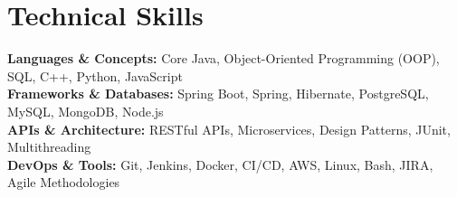 \medskip

\resumeItemListStart
{}
\resumeItemListEnd
\resumeItemListEnd

\resumeSubHeadingListEnd

\section{Technical Skills}
\begin{itemize}[leftmargin=0.15in, label={}]
  \small{\item{
        \textbf{Languages \& Concepts:} {Core Java, Object-Oriented Programming (OOP), SQL, C++, Python, JavaScript} \\
        \textbf{Frameworks \& Databases:} {Spring Boot, Spring, Hibernate, PostgreSQL, MySQL, MongoDB, Node.js} \\
        \textbf{APIs \& Architecture:} {RESTful APIs, Microservices, Design Patterns, JUnit, Multithreading} \\
        \textbf{DevOps \& Tools:} {Git, Jenkins, Docker, CI/CD, AWS, Linux, Bash, JIRA, Agile Methodologies} \\
        }}
\end{itemize}
